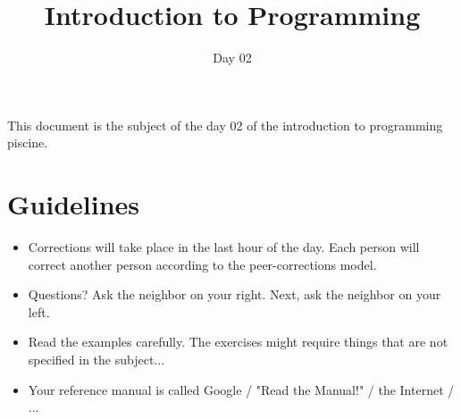 \documentclass{42-en}
\begin{document}
\title{Introduction to Programming }
\subtitle{Day 02}


\summary
{
This document is the subject of the day 02 of the introduction to programming
piscine.
}

\maketitle

\tableofcontents



\chapter{Guidelines}

\begin{itemize}

  \item Corrections will take place in the last hour of the day. Each person will
  correct another person according to the peer-corrections model.
 
  \item Questions? Ask the neighbor on your right. Next, ask the neighbor on your
  left.
  
  \item Read the examples carefully. The exercises might require things that are
  not specified in the subject...

  \item Your reference manual is called Google / "Read the Manual!" / the Internet
  / ...

\end{itemize}

\newpage


\end{document}
